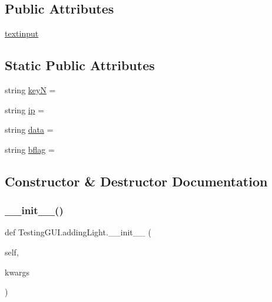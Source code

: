 \subsection*{Public Attributes}
\begin{DoxyCompactItemize}
\item 
\hyperlink{classTestingGUI_1_1addingLight_a019891e6b3abbd0964de1e86a6a899e1}{textinput}
\end{DoxyCompactItemize}
\subsection*{Static Public Attributes}
\begin{DoxyCompactItemize}
\item 
string \hyperlink{classTestingGUI_1_1addingLight_ace412281b65c6556693f272d54e46da0}{keyN} = \textquotesingle{}\textquotesingle{}
\item 
string \hyperlink{classTestingGUI_1_1addingLight_afc65af761152e3325cc2cc225c9e8f7d}{ip} = \textquotesingle{}\textquotesingle{}
\item 
string \hyperlink{classTestingGUI_1_1addingLight_a763aa941465f77b12ffea9edba79c399}{data} = \textquotesingle{}\textquotesingle{}
\item 
string \hyperlink{classTestingGUI_1_1addingLight_a7e0afbbe8a8437243d79b5a296dbb36e}{bflag} = \textquotesingle{}\textquotesingle{}
\end{DoxyCompactItemize}


\subsection{Constructor \& Destructor Documentation}
\mbox{\label{classTestingGUI_1_1addingLight_ace8a7edfba84662f465ad3b6cc979ba0}} 
\subsubsection{\texorpdfstring{\+\_\+\+\_\+init\+\_\+\+\_\+()}{\_\_init\_\_()}\hspace{0.1cm}{\footnotesize\ttfamily [1/2]}}
{\footnotesize\ttfamily def Testing\+G\+U\+I.\+adding\+Light.\+\_\+\+\_\+init\+\_\+\+\_\+ (\begin{DoxyParamCaption}\item[{}]{self,  }\item[{}]{kwargs }\end{DoxyParamCaption})}

